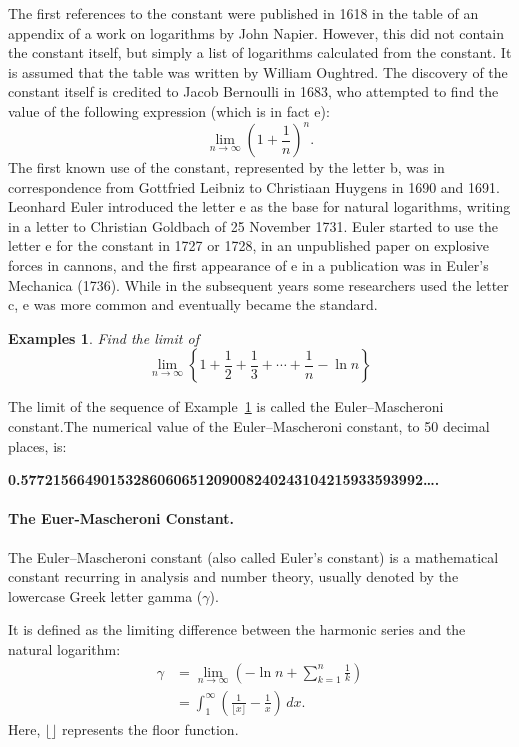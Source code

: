 \documentclass[a4paper,12pt]{article} %
\newtheorem{example}{Examples}
\begin{document}
The first references to the constant were published in 1618 in the table of 
an appendix of a work on logarithms by John Napier. However, this did not contain 
the constant itself, but simply a list of logarithms calculated from the constant. 
It is assumed that the table was written by William Oughtred. The discovery of the 
constant itself is credited to Jacob Bernoulli in 1683, who attempted to find the 
value of the following expression (which is in fact e):
\[
    \lim _{n\to \infty }\left(1+\frac {1}{n}\right)^{n}.
\]
The first known use of the constant, represented by the letter b, was in correspondence 
from Gottfried Leibniz to Christiaan Huygens in 1690 and 1691. Leonhard Euler introduced 
the letter e as the base for natural logarithms, writing in a letter to 
Christian Goldbach of 25 November 1731. Euler started to use the letter e 
for the constant in 1727 or 1728, in an unpublished paper on explosive 
forces in cannons, and the first appearance of e in a publication was 
in Euler's Mechanica (1736). While in the subsequent years some researchers 
used the letter c, e was more common and eventually became the standard.

\begin{example}
    \emph{Find the limit of }
    \[
        \lim_{n \to \infty}\left\{1 + \frac{1}{2} + \frac{1}{3} + \cdots + \frac{1}{n} - \ln n \right\}
        \]
    \label{ex:ex1}
\end{example}

The limit of the sequence of Example~\ref{ex:ex1} is called the Euler–Mascheroni 
constant.The numerical value of the Euler–Mascheroni constant, to 50 decimal 
places, is:

\textbf{0.57721566490153286060651209008240243104215933593992….}

\paragraph{{\rm \textbf{The Euer-Mascheroni Constant.}}}
The Euler–Mascheroni constant (also called Euler's constant) is a mathematical 
constant recurring in analysis and number theory, usually denoted by the 
lowercase Greek letter gamma ($\gamma$).

It is defined as the limiting difference between the harmonic series and 
the natural logarithm:
\[
    \begin{aligned}
        \gamma &=\lim_{n\to \infty }\left(-\ln n+\sum _{k=1}^{n}\frac {1}{k}\right)\\
    &=\int _{1}^{\infty }\left(\frac {1}{\lfloor x\rfloor }-\frac {1}{x}\right)
    \,dx.
    \end{aligned}
    \]
Here, $\lfloor \rfloor$ represents the floor function.
\end{document}
